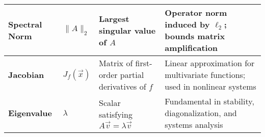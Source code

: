 \documentclass[12pt]{article}
\begin{document}
\begin{longtable}{|>{\bfseries}m{2.5cm}|m{2.5cm}|p{4.6cm}|p{7cm}|}
\hline
Spectral Norm & $\lVert A\rVert_2$ & Largest singular value of $A$ & Operator norm induced by $\ell_2$; bounds matrix amplification \\
\hline
Jacobian & $J_f(\vec{x})$ & Matrix of first-order partial derivatives of $f$ & Linear approximation for multivariate functions; used in nonlinear systems \\
\hline
Eigenvalue & $\lambda$ & Scalar satisfying $A\vec{v} = \lambda\vec{v}$ & Fundamental in stability, diagonalization, and systems analysis \\

\end{longtable}
\end{document}
